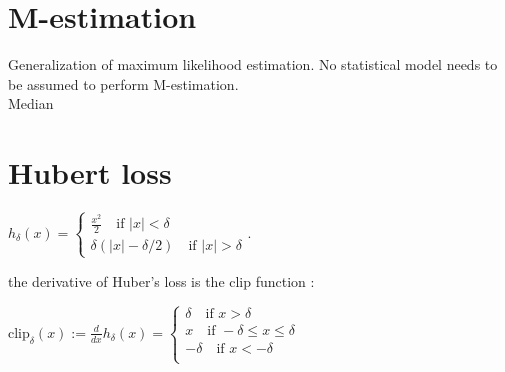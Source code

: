 \section{M-estimation}

Generalization of maximum likelihood estimation. No statistical model needs to be assumed to perform M-estimation.\\


Median


\section{Hubert loss}

$h_\delta (x) = \begin{cases}  \frac{x^2}{2} \quad \text {if} \,  \,  \left| x \right| < \delta \\ \delta ( \left| x \right| - \delta /2 ) \quad \text {if} \,  \,  \left| x \right| > \delta \end{cases}.$

the derivative of Huber's loss is the clip function :

$\text {clip}_\delta (x) := \frac{d}{dx} h_\delta (x) = \begin{cases}  \delta \quad \text {if} \,  \,  x > \delta \\ x \quad \text {if} \,  \,  -\delta \leq x \leq \delta \\ -\delta \quad \text {if} \,  \,  x < -\delta \\ \end{cases}$